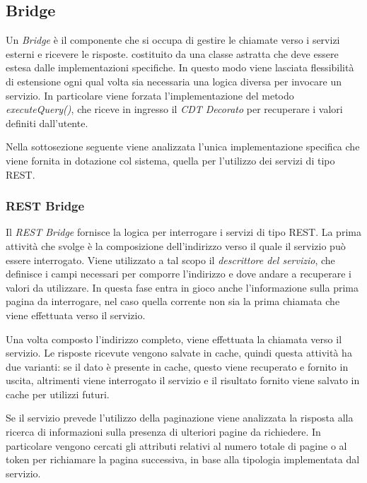 \subsection{Bridge\label{sec:bridge}}

Un \emph{Bridge} è il componente che si occupa di gestire le chiamate verso i servizi esterni e ricevere le risposte. \upe costituito da una classe astratta che deve essere estesa dalle implementazioni specifiche. In questo modo viene lasciata flessibilità di estensione ogni qual volta sia necessaria una logica diversa per invocare un servizio. In particolare viene forzata l'implementazione del metodo \emph{executeQuery()}, che riceve in ingresso il \emph{CDT Decorato} per recuperare i valori definiti dall'utente.

Nella sottosezione seguente viene analizzata l'unica implementazione specifica che viene fornita in dotazione col sistema, quella per l'utilizzo dei servizi di tipo REST.

\subsubsection*{REST Bridge}

Il \emph{REST Bridge} fornisce la logica per interrogare i servizi di tipo REST. La prima attività che svolge è la composizione dell'indirizzo verso il quale il servizio può essere interrogato. Viene utilizzato a tal scopo il \emph{descrittore del servizio}, che definisce i campi necessari per comporre l'indirizzo e dove andare a recuperare i valori da utilizzare. In questa fase entra in gioco anche l'informazione sulla prima pagina da interrogare, nel caso quella corrente non sia la prima chiamata che viene effettuata verso il servizio.

Una volta composto l'indirizzo completo, viene effettuata la chiamata verso il servizio. Le risposte ricevute vengono salvate in cache, quindi questa attività ha due varianti: se il dato è presente in cache, questo viene recuperato e fornito in uscita, altrimenti viene interrogato il servizio e il risultato fornito viene salvato in cache per utilizzi futuri.

Se il servizio prevede l'utilizzo della paginazione viene analizzata la risposta alla ricerca di informazioni sulla presenza di ulteriori pagine da richiedere. In particolare vengono cercati gli attributi relativi al numero totale di pagine o al token per richiamare la pagina successiva, in base alla tipologia implementata dal servizio.

